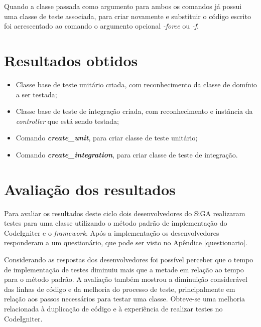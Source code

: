         Quando a classe passada como argumento para ambos os comandos já possui uma classe de teste associada, para criar novamente e substituir o código escrito foi acrescentado ao comando o argumento opcional \textit{-force} ou \textit{-f}. 

  
  \section{Resultados obtidos}
      
    \begin{itemize}

      \item Classe base de teste unitário criada, com reconhecimento da classe de domínio a ser testada;
      
      \item Classe base de teste de integração criada, com reconhecimento e instância da \textit{controller} que está sendo testada;
            
      \item Comando \textit{\textbf{create\_unit}}, para criar classe de teste unitário;

      \item Comando \textit{\textbf{create\_integration}}, para criar classe de teste de integração.

    \end{itemize}
  
  \section{Avaliação dos resultados}

    Para avaliar os resultados deste ciclo dois desenvolvedores do SiGA realizaram testes para uma classe utilizando o método padrão de implementação do CodeIgniter e o \textit{framework}. Após a implementação os desenvolvedores responderam a um questionário, que pode ser visto no Apêndice \ref{questionario}. 

    Considerando as respostas dos desenvolvedores foi possível perceber que o tempo de implementação de testes diminuiu mais que a metade em relação ao tempo para o método padrão. A avaliação também mostrou a diminuição considerável das linhas de código e da melhoria do processo de teste, principalmente em relação aos passos necessários para testar uma classe. Obteve-se uma melhoria relacionada à duplicação de código e à experiência de realizar testes no CodeIgniter. 
  
